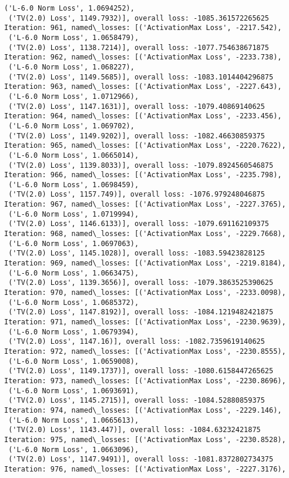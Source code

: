 \documentclass[10pt]{article}
\begin{document}
\begin{Verbatim}[commandchars=\\\{\}]
 ('L-6.0 Norm Loss', 1.0694252),
 ('TV(2.0) Loss', 1149.7932)], overall loss: -1085.361572265625
Iteration: 961, named\_losses: [('ActivationMax Loss', -2217.542),
 ('L-6.0 Norm Loss', 1.0658479),
 ('TV(2.0) Loss', 1138.7214)], overall loss: -1077.754638671875
Iteration: 962, named\_losses: [('ActivationMax Loss', -2233.738),
 ('L-6.0 Norm Loss', 1.068227),
 ('TV(2.0) Loss', 1149.5685)], overall loss: -1083.1014404296875
Iteration: 963, named\_losses: [('ActivationMax Loss', -2227.643),
 ('L-6.0 Norm Loss', 1.0712966),
 ('TV(2.0) Loss', 1147.1631)], overall loss: -1079.40869140625
Iteration: 964, named\_losses: [('ActivationMax Loss', -2233.456),
 ('L-6.0 Norm Loss', 1.069702),
 ('TV(2.0) Loss', 1149.9202)], overall loss: -1082.46630859375
Iteration: 965, named\_losses: [('ActivationMax Loss', -2220.7622),
 ('L-6.0 Norm Loss', 1.0665014),
 ('TV(2.0) Loss', 1139.8033)], overall loss: -1079.8924560546875
Iteration: 966, named\_losses: [('ActivationMax Loss', -2235.798),
 ('L-6.0 Norm Loss', 1.0698459),
 ('TV(2.0) Loss', 1157.749)], overall loss: -1076.979248046875
Iteration: 967, named\_losses: [('ActivationMax Loss', -2227.3765),
 ('L-6.0 Norm Loss', 1.0719994),
 ('TV(2.0) Loss', 1146.6133)], overall loss: -1079.691162109375
Iteration: 968, named\_losses: [('ActivationMax Loss', -2229.7668),
 ('L-6.0 Norm Loss', 1.0697063),
 ('TV(2.0) Loss', 1145.1028)], overall loss: -1083.59423828125
Iteration: 969, named\_losses: [('ActivationMax Loss', -2219.8184),
 ('L-6.0 Norm Loss', 1.0663475),
 ('TV(2.0) Loss', 1139.3656)], overall loss: -1079.3863525390625
Iteration: 970, named\_losses: [('ActivationMax Loss', -2233.0098),
 ('L-6.0 Norm Loss', 1.0685372),
 ('TV(2.0) Loss', 1147.8192)], overall loss: -1084.1219482421875
Iteration: 971, named\_losses: [('ActivationMax Loss', -2230.9639),
 ('L-6.0 Norm Loss', 1.0679394),
 ('TV(2.0) Loss', 1147.16)], overall loss: -1082.7359619140625
Iteration: 972, named\_losses: [('ActivationMax Loss', -2230.8555),
 ('L-6.0 Norm Loss', 1.0659008),
 ('TV(2.0) Loss', 1149.1737)], overall loss: -1080.6158447265625
Iteration: 973, named\_losses: [('ActivationMax Loss', -2230.8696),
 ('L-6.0 Norm Loss', 1.0693691),
 ('TV(2.0) Loss', 1145.2715)], overall loss: -1084.52880859375
Iteration: 974, named\_losses: [('ActivationMax Loss', -2229.146),
 ('L-6.0 Norm Loss', 1.0665613),
 ('TV(2.0) Loss', 1143.447)], overall loss: -1084.63232421875
Iteration: 975, named\_losses: [('ActivationMax Loss', -2230.8528),
 ('L-6.0 Norm Loss', 1.0663096),
 ('TV(2.0) Loss', 1147.9491)], overall loss: -1081.8372802734375
Iteration: 976, named\_losses: [('ActivationMax Loss', -2227.3176),

\end{Verbatim}
\end{document}
